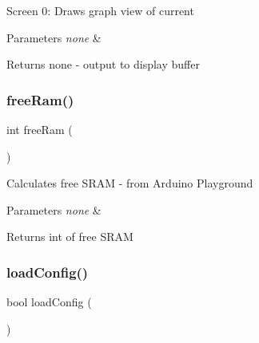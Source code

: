 Screen 0\+: Draws graph view of current


\begin{DoxyParams}{Parameters}
{\em none} & \\
\hline
\end{DoxyParams}
\begin{DoxyReturn}{Returns}
none -\/ output to display buffer 
\end{DoxyReturn}
\hypertarget{_u_s_b___tester___o_l_e_d__128x64___beta__2_82_8ino_aac7b29dc45caaaca67299571f6a2dcc0}{}\label{_u_s_b___tester___o_l_e_d__128x64___beta__2_82_8ino_aac7b29dc45caaaca67299571f6a2dcc0} 
\subsubsection{\texorpdfstring{free\+Ram()}{freeRam()}}
{\footnotesize\ttfamily int free\+Ram (\begin{DoxyParamCaption}{ }\end{DoxyParamCaption})}

Calculates free S\+R\+AM -\/ from Arduino Playground


\begin{DoxyParams}{Parameters}
{\em none} & \\
\hline
\end{DoxyParams}
\begin{DoxyReturn}{Returns}
int of free S\+R\+AM 
\end{DoxyReturn}
\hypertarget{_u_s_b___tester___o_l_e_d__128x64___beta__2_82_8ino_a391c03491ec82959f142de94af1ff7a2}{}\label{_u_s_b___tester___o_l_e_d__128x64___beta__2_82_8ino_a391c03491ec82959f142de94af1ff7a2} 
\subsubsection{\texorpdfstring{load\+Config()}{loadConfig()}}
{\footnotesize\ttfamily bool load\+Config (\begin{DoxyParamCaption}{ }\end{DoxyParamCaption})}

